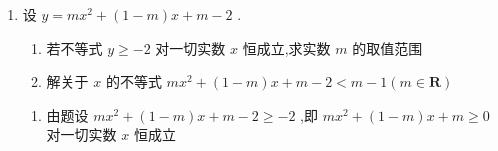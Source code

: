 \begin{enumerate}
\begin{jieda}
\begin{enumerate}
            故 $\Delta  = {\left( -a - 1\right) }^{2} - 4\left( {a + \dfrac{1}{4}}\right)  < 0$ ,化简得 $\Delta  = a\left( {a - 2}\right)  < 0$ ,解得 $0 < a < 2$
            \item $f\left( x\right)  = {x}^{2} - \left( {a + 1}\right) x + a > 0$ ,即 $\left( {x - a}\right) \left( {x - 1}\right)  > 0$
        \end{enumerate}
    \end{jieda}
    
    \item 设 $y = m{x}^{2} + \left( {1 - m}\right) x + m - 2$ .
    \begin{enumerate}
        \item 若不等式 $y \geq   - 2$ 对一切实数 $x$ 恒成立,求实数 $m$ 的取值范围
        \item 解关于 $x$ 的不等式 $m{x}^{2} + \left( {1 - m}\right) x + m - 2 < m - 1\left( {m \in  \mathbf{R}}\right)$
    \end{enumerate}
    \begin{jieda}
        \begin{enumerate}
            \item 由题设 $m{x}^{2} + \left( {1 - m}\right) x + m - 2 \geq   - 2$ ,即 $m{x}^{2} + \left( {1 - m}\right) x + m \geq  0$ 对一切实数 $x$ 恒成立


\end{enumerate}
\end{jieda}
\end{enumerate}
